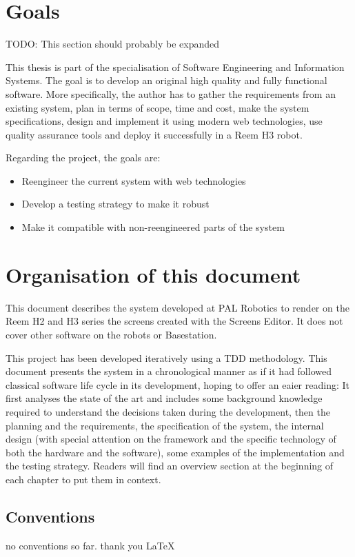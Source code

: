 \section{Goals}
TODO: This section should probably be expanded

This thesis is part of the specialisation of Software Engineering and Information Systems. 
The goal is to develop an original high quality and fully functional software. 
More specifically, the author has to gather the requirements from an existing system, plan in terms of scope, time and cost, make the system specifications, design and implement it using modern web technologies, use quality assurance tools and deploy it successfully in a Reem H3 robot.

Regarding the project, the goals are:
\begin{itemize}
\item Reengineer the current system with web technologies
\item Develop a testing strategy to make it robust
\item Make it compatible with non-reengineered parts of the system
\end{itemize}

\section{Organisation of this document}
This document describes the system developed at PAL Robotics to render on the Reem H2 and H3 series the screens created with the Screens Editor.
It does not cover other software on the robots or Basestation.

This project has been developed iteratively using a \ac{TDD} methodology. 
This document presents the system in a chronological manner as if it had followed classical software life cycle in its development, hoping to offer an eaier reading:
It first analyses the state of the art and includes some background knowledge required to understand the decisions taken during the development, then the planning and the requirements, the specification of the system, the internal design (with special attention on the framework and the specific technology of both the hardware and the software), some examples of the implementation and the testing strategy.
Readers will find an overview section at the beginning of each chapter to put them in context.

\subsection{Conventions}
no conventions so far. thank you \LaTeX
